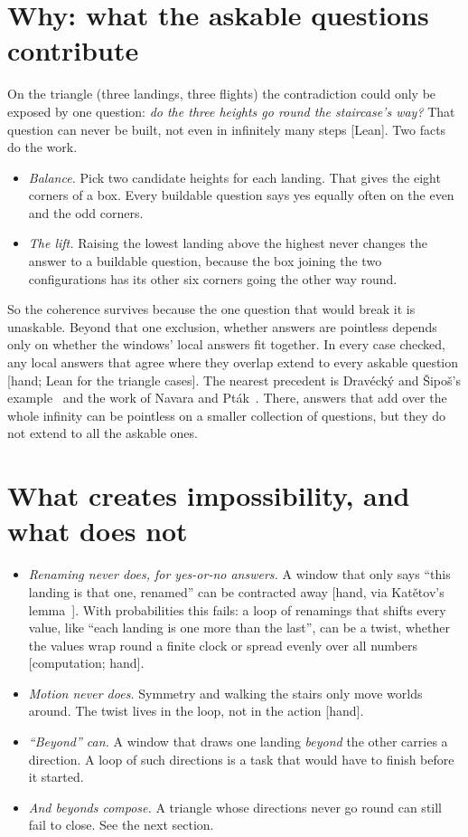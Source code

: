 \documentclass[11pt]{article}
\newcommand{\st}[1]{\textsf{\small[#1]}}
\begin{document}
\section{Why: what the askable questions contribute}
On the triangle (three landings, three flights) the contradiction could only be
exposed by one question: \emph{do the three heights go round the staircase's
way?} That question can never be built, not even in infinitely many steps
\st{Lean}. Two facts do the work.
\begin{itemize}[nosep]
  \item \emph{Balance.} Pick two candidate heights for each landing. That gives
    the eight corners of a box. Every buildable question says yes equally often
    on the even and the odd corners.
  \item \emph{The lift.} Raising the lowest landing above the highest never
    changes the answer to a buildable question, because the box joining the two
    configurations has its other six corners going the other way round.
\end{itemize}
So the coherence survives because the one question that would break it is
unaskable. Beyond that one exclusion, whether answers are pointless depends only
on whether the windows' local answers fit together. In every case checked, any
local answers that agree where they overlap extend to every askable question
\st{hand; Lean for the triangle cases}. The nearest precedent is
Drav\'eck\'y and \v{S}ipo\v{s}'s example~\cite{draveckysipos1980} and the work
of Navara and Pt\'ak~\cite{navaraptak1983,navara1984}. There, answers that
add over the whole infinity can be pointless on a smaller collection of
questions, but they do not extend to all the askable ones.

\section{What creates impossibility, and what does not}
\begin{itemize}[nosep]
  \item \emph{Renaming never does, for yes-or-no answers.} A window that only
    says ``this landing is that one, renamed'' can be contracted away \st{hand,
    via Katětov's lemma~\cite{katetov1967}}. With probabilities this fails:
    a loop of renamings that shifts every value, like ``each landing is one more
    than the last'', can be a twist, whether the values wrap round a finite
    clock or spread evenly over all numbers \st{computation; hand}.
  \item \emph{Motion never does.} Symmetry and walking the stairs only move
    worlds around. The twist lives in the loop, not in the action \st{hand}.
  \item \emph{``Beyond'' can.} A window that draws one landing \emph{beyond} the
    other carries a direction. A loop of such directions is a task that would
    have to finish before it started.
  \item \emph{And beyonds compose.} A triangle whose directions never go round
    can still fail to close. See the next section.
\end{itemize}
\end{document}
